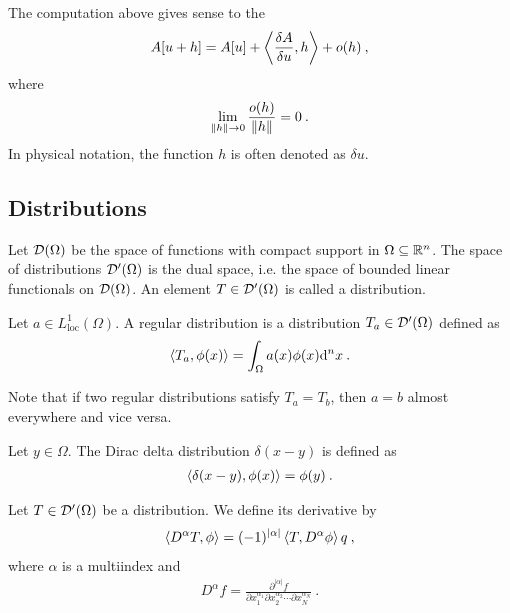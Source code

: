 The computation above gives sense to the 
\begin{align}
    A[u+h] = A[u] + \left \langle \frac{\delta A}{\delta u} ,h \right \rangle + o(h)\:,
\end{align}
where
\begin{align}
    \lim_{\left \Vert h \right \Vert \rightarrow 0} \frac{o(h)}{\left \Vert h \right \Vert} = 0 \:.
\end{align}
In physical notation, the function $h$ is often denoted as $\delta u$.


\subsection{Distributions}

\begin{definition}[Distributions]
    Let $\mathcal{D}(\Omega)$ be the space of functions with compact support in $\Omega \subseteq \mathbb{R}^n$. The space of distributions $\mathcal{D'}(\Omega)$ is the dual space, i.e. the space of bounded linear functionals on $\mathcal{D}(\Omega)$. An element $T \in \mathcal{D'}(\Omega)$ is called a distribution.
\end{definition}

\begin{definition}
    Let $a \in L^1_{\text{loc}}(\Omega)$. A regular distribution is a distribution $T_a \in \mathcal{D'}(\Omega)$ defined as
    \begin{align}
        \left \langle T_a ,\phi(x) \right \rangle = \int_\Omega a(x) \phi(x) \mathrm{d}^n x \:.
    \end{align}
\end{definition}

Note that if two regular distributions satisfy $T_a = T_b$, then $a=b$ almost everywhere and vice versa.

\begin{definition}
    Let $y \in \Omega$. The Dirac delta distribution $\delta(x-y)$ is defined as
    \begin{align}
        \left \langle \delta(x-y) ,\phi(x) \right \rangle = \phi(y) \:. 
    \end{align}
\end{definition}



\begin{definition}
    Let $T \in \mathcal{D'}(\Omega)$ be a distribution. We define its derivative by
    \begin{align}
        \left \langle D^\alpha T ,\phi \right \rangle = (-1)^{|\alpha|} \left \langle T ,D^\alpha \phi \right \rangle q \:,
    \end{align}
    where $\alpha$ is a multiindex and
    \begin{align}
        D^\alpha f = \frac{\partial^{|\alpha|} f}{\partial x_1^{\alpha_1} \partial x_2^{\alpha_2} \cdots \partial x^{\alpha_N}_N} \:.
    \end{align}
\end{definition}




